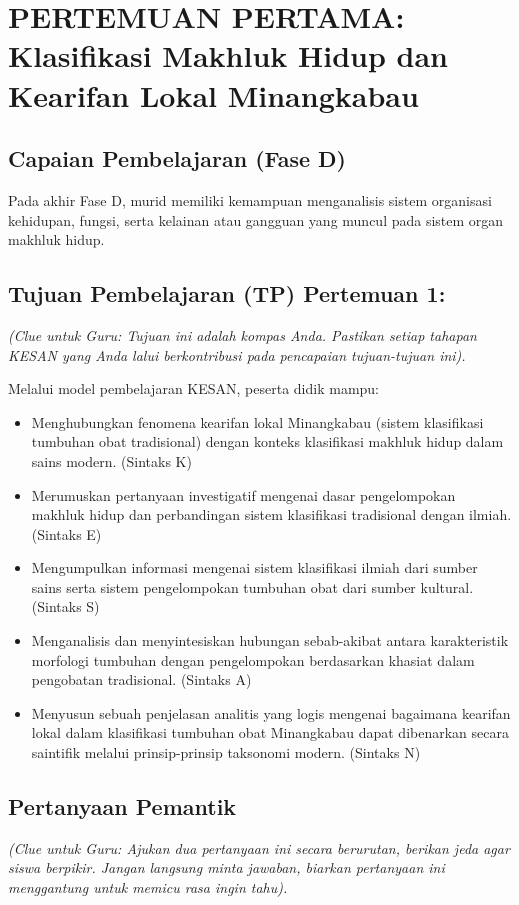 \documentclass[a4paper,12pt]{article}
\begin{document}
\section{PERTEMUAN PERTAMA: Klasifikasi Makhluk Hidup dan Kearifan Lokal Minangkabau}

\subsection{Capaian Pembelajaran (Fase D)}
Pada akhir Fase D, murid memiliki kemampuan menganalisis sistem organisasi kehidupan, fungsi, serta kelainan atau gangguan yang muncul pada sistem organ makhluk hidup.

\subsection{Tujuan Pembelajaran (TP) Pertemuan 1:}
\textit{(Clue untuk Guru: Tujuan ini adalah kompas Anda. Pastikan setiap tahapan KESAN yang Anda lalui berkontribusi pada pencapaian tujuan-tujuan ini).}

Melalui model pembelajaran KESAN, peserta didik mampu:
\begin{itemize}
\item Menghubungkan fenomena kearifan lokal Minangkabau (sistem klasifikasi tumbuhan obat tradisional) dengan konteks klasifikasi makhluk hidup dalam sains modern. (Sintaks K)
\item Merumuskan pertanyaan investigatif mengenai dasar pengelompokan makhluk hidup dan perbandingan sistem klasifikasi tradisional dengan ilmiah. (Sintaks E)
\item Mengumpulkan informasi mengenai sistem klasifikasi ilmiah dari sumber sains serta sistem pengelompokan tumbuhan obat dari sumber kultural. (Sintaks S)
\item Menganalisis dan menyintesiskan hubungan sebab-akibat antara karakteristik morfologi tumbuhan dengan pengelompokan berdasarkan khasiat dalam pengobatan tradisional. (Sintaks A)
\item Menyusun sebuah penjelasan analitis yang logis mengenai bagaimana kearifan lokal dalam klasifikasi tumbuhan obat Minangkabau dapat dibenarkan secara saintifik melalui prinsip-prinsip taksonomi modern. (Sintaks N)
\end{itemize}

\subsection{Pertanyaan Pemantik}
\textit{(Clue untuk Guru: Ajukan dua pertanyaan ini secara berurutan, berikan jeda agar siswa berpikir. Jangan langsung minta jawaban, biarkan pertanyaan ini menggantung untuk memicu rasa ingin tahu).}
\end{document}

